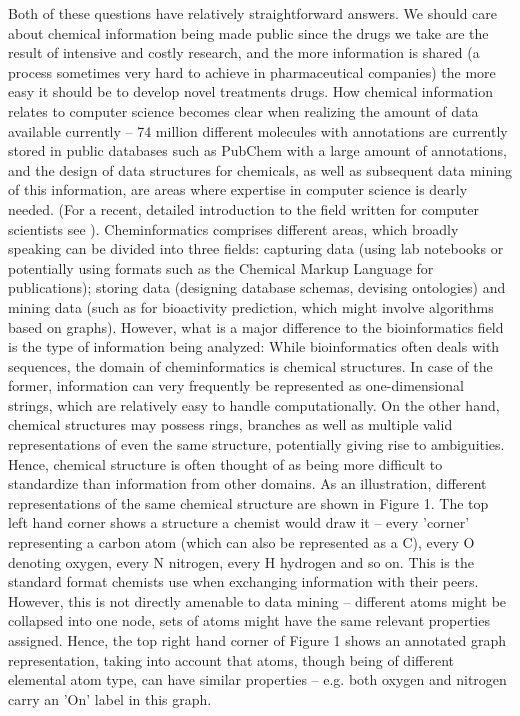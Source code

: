 \documentclass{sig-alternate}
\begin{document}
Both of these questions have relatively straightforward answers. We should care
about chemical information being made public since the drugs we take are the
result of intensive and costly research, and the more information is shared (a
process sometimes very hard to achieve in pharmaceutical companies) the more
easy it should be to develop novel treatments drugs. How chemical information
relates to computer science becomes clear when realizing the amount of data
available currently -- 74 million different molecules with annotations are
currently stored in public databases such as PubChem with a large amount of
annotations, and the design of data structures for chemicals, as well as
subsequent data mining of this information, are areas where expertise in
computer science is dearly needed. (For a recent, detailed introduction to the
field written for computer scientists see \cite{brown2009}). Cheminformatics
comprises different areas, which broadly speaking can be divided into three
fields: capturing data (using lab notebooks or potentially using formats such as
the Chemical Markup Language for publications); storing data (designing database
schemas, devising ontologies) and mining data (such as for bioactivity
prediction, which might involve algorithms based on graphs). However, what is a
major difference to the bioinformatics field is the type of information being
analyzed: While bioinformatics often deals with sequences, the domain of
cheminformatics is chemical structures. In case of the former, information can
very frequently be represented as one-dimensional strings, which are relatively
easy to handle computationally. On the other hand, chemical structures may
possess rings, branches as well as multiple valid representations of even the
same structure, potentially giving rise to ambiguities. Hence, chemical
structure is often thought of as being more difficult to standardize than
information from other domains. As an illustration, different representations of
the same chemical structure are shown in Figure 1. The top left hand corner
shows a structure a chemist would draw it -- every 'corner' representing a carbon
atom (which can also be represented as a C), every O denoting oxygen, every N
nitrogen, every H hydrogen and so on. This is the standard format chemists use
when exchanging information with their peers. However, this is not directly
amenable to data mining -- different atoms might be collapsed into one node,
sets of atoms might have the same relevant properties assigned. Hence, the top
right hand corner of Figure 1 shows an annotated graph representation, taking
into account that atoms, though being of different elemental atom type, can have
similar properties -- e.g. both oxygen and nitrogen carry an 'On' label in this
graph.
\end{document}
